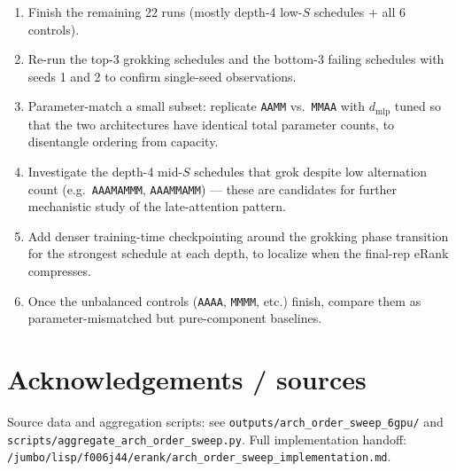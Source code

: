 \documentclass[10pt]{article}
\begin{document}
\begin{enumerate}
\item Finish the remaining 22 runs (mostly depth-4 low-$S$ schedules + all 6 controls).

\item Re-run the top-3 grokking schedules and the bottom-3 failing schedules with seeds 1 and 2 to confirm single-seed observations.

\item Parameter-match a small subset: replicate \texttt{AAMM} vs.\ \texttt{MMAA} with $d_\text{mlp}$ tuned so that the two architectures have identical total parameter counts, to disentangle ordering from capacity.

\item Investigate the depth-4 mid-$S$ schedules that grok despite low alternation count (e.g.\ \texttt{AAAMAMMM}, \texttt{AAAMMAMM}) --- these are candidates for further mechanistic study of the late-attention pattern.

\item Add denser training-time checkpointing around the grokking phase transition for the strongest schedule at each depth, to localize when the final-rep eRank compresses.

\item Once the unbalanced controls (\texttt{AAAA}, \texttt{MMMM}, etc.) finish, compare them as parameter-mismatched but pure-component baselines.
\end{enumerate}

\section*{Acknowledgements / sources}

Source data and aggregation scripts: see \texttt{outputs/arch\_order\_sweep\_6gpu/} and \texttt{scripts/aggregate\_arch\_order\_sweep.py}. Full implementation handoff: \texttt{/jumbo/lisp/f006j44/erank/arch\_order\_sweep\_implementation.md}.
\end{document}
